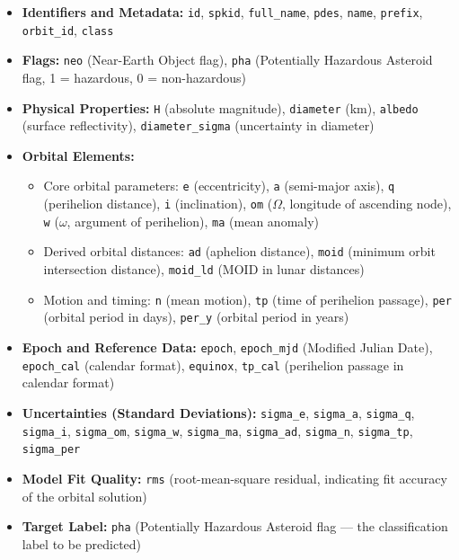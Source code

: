 \documentclass{article}
\begin{document}
\begin{itemize}
    \item \textbf{Identifiers and Metadata:} \texttt{id}, \texttt{spkid}, \texttt{full\_name}, \texttt{pdes}, \texttt{name}, \texttt{prefix}, \texttt{orbit\_id}, \texttt{class}

    \item \textbf{Flags:} \texttt{neo} (Near-Earth Object flag), \texttt{pha} (Potentially Hazardous Asteroid flag, 1 = hazardous, 0 = non-hazardous)

    \item \textbf{Physical Properties:} \texttt{H} (absolute magnitude), \texttt{diameter} (km), \texttt{albedo} (surface reflectivity), \texttt{diameter\_sigma} (uncertainty in diameter)

    \item \textbf{Orbital Elements:}
    \begin{itemize}
        \item Core orbital parameters: \texttt{e} (eccentricity), \texttt{a} (semi-major axis), \texttt{q} (perihelion distance), \texttt{i} (inclination), \texttt{om} ($\Omega$, longitude of ascending node), \texttt{w} ($\omega$, argument of perihelion), \texttt{ma} (mean anomaly)
        \item Derived orbital distances: \texttt{ad} (aphelion distance), \texttt{moid} (minimum orbit intersection distance), \texttt{moid\_ld} (MOID in lunar distances)
        \item Motion and timing: \texttt{n} (mean motion), \texttt{tp} (time of perihelion passage), \texttt{per} (orbital period in days), \texttt{per\_y} (orbital period in years)
    \end{itemize}

    \item \textbf{Epoch and Reference Data:} \texttt{epoch}, \texttt{epoch\_mjd} (Modified Julian Date), \texttt{epoch\_cal} (calendar format), \texttt{equinox}, \texttt{tp\_cal} (perihelion passage in calendar format)

    \item \textbf{Uncertainties (Standard Deviations):} \texttt{sigma\_e}, \texttt{sigma\_a}, \texttt{sigma\_q}, \texttt{sigma\_i}, \texttt{sigma\_om}, \texttt{sigma\_w}, \texttt{sigma\_ma}, \texttt{sigma\_ad}, \texttt{sigma\_n}, \texttt{sigma\_tp}, \texttt{sigma\_per}

    \item \textbf{Model Fit Quality:} \texttt{rms} (root-mean-square residual, indicating fit accuracy of the orbital solution)

    \item \textbf{Target Label:} \texttt{pha} (Potentially Hazardous Asteroid flag — the classification label to be predicted)
\end{itemize}
\end{document}
